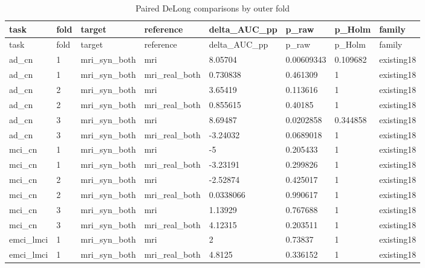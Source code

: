 \documentclass{article}
\begin{document}


\begin{landscape}
\begingroup
\footnotesize
\setlength{\tabcolsep}{4pt}
\begin{longtable}{llllllll}
\caption{{\color{blue}Paired DeLong comparisons by outer fold}}\label{tab:classification_delong}\\
\toprule
task & fold & target & reference & delta\_AUC\_pp & p\_raw & p\_Holm & family \\
\midrule
\endfirsthead
\toprule
task & fold & target & reference & delta\_AUC\_pp & p\_raw & p\_Holm & family \\
\midrule
\endhead
\bottomrule
\endfoot
ad\_cn & 1 & mri\_syn\_both & mri & 8.05704 & 0.00609343 & 0.109682 & existing18 \\
ad\_cn & 1 & mri\_syn\_both & mri\_real\_both & 0.730838 & 0.461309 & 1 & existing18 \\
ad\_cn & 2 & mri\_syn\_both & mri & 3.65419 & 0.113616 & 1 & existing18 \\
ad\_cn & 2 & mri\_syn\_both & mri\_real\_both & 0.855615 & 0.40185 & 1 & existing18 \\
ad\_cn & 3 & mri\_syn\_both & mri & 8.69487 & 0.0202858 & 0.344858 & existing18 \\
ad\_cn & 3 & mri\_syn\_both & mri\_real\_both & -3.24032 & 0.0689018 & 1 & existing18 \\
mci\_cn & 1 & mri\_syn\_both & mri & -5 & 0.205433 & 1 & existing18 \\
mci\_cn & 1 & mri\_syn\_both & mri\_real\_both & -3.23191 & 0.299826 & 1 & existing18 \\
mci\_cn & 2 & mri\_syn\_both & mri & -2.52874 & 0.425017 & 1 & existing18 \\
mci\_cn & 2 & mri\_syn\_both & mri\_real\_both & 0.0338066 & 0.990617 & 1 & existing18 \\
mci\_cn & 3 & mri\_syn\_both & mri & 1.13929 & 0.767688 & 1 & existing18 \\
mci\_cn & 3 & mri\_syn\_both & mri\_real\_both & 4.12315 & 0.203511 & 1 & existing18 \\
emci\_lmci & 1 & mri\_syn\_both & mri & 2 & 0.73837 & 1 & existing18 \\
emci\_lmci & 1 & mri\_syn\_both & mri\_real\_both & 4.8125 & 0.336152 & 1 & existing18 \\

\end{longtable}
\end{landscape}
\end{document}

